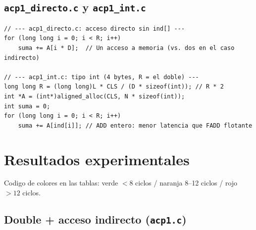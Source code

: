 \documentclass[12pt,a4paper]{article}
\newcommand{\cverde}[1]{\textcolor{verde}{#1}}
\newcommand{\cnaranja}[1]{\textcolor{naranja}{#1}}
\newcommand{\crojo}[1]{\textcolor{rojo}{#1}}
\begin{document}
\subsection{\texttt{acp1\_directo.c} y \texttt{acp1\_int.c}}

\begin{lstlisting}[caption={Diferencias clave de las variantes adicionales}, label=lst:variantes]
// --- acp1_directo.c: acceso directo sin ind[] ---
for (long long i = 0; i < R; i++)
    suma += A[i * D];  // Un acceso a memoria (vs. dos en el caso indirecto)

// --- acp1_int.c: tipo int (4 bytes, R = el doble) ---
long long R = (long long)L * CLS / (D * sizeof(int)); // R * 2
int *A = (int*)aligned_alloc(CLS, N * sizeof(int));
int suma = 0;
for (long long i = 0; i < R; i++)
    suma += A[ind[i]]; // ADD entero: menor latencia que FADD flotante
\end{lstlisting}

\section{Resultados experimentales}

Codigo de colores en las tablas: \cverde{verde $< 8$ ciclos} / \cnaranja{naranja 8--12 ciclos} / \crojo{rojo $> 12$ ciclos}.

\subsection{Double + acceso indirecto (\texttt{acp1.c})}
\end{document}
